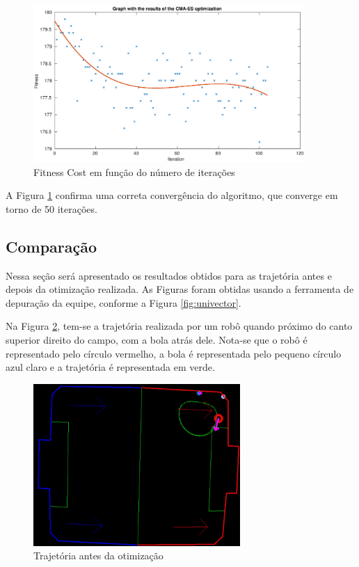 \documentclass[10pt,fleqn,a4paper]{article}
\begin{document}
\begin{figure}[H]
	\centering
	\includegraphics[width=0.92\textwidth]{figures/CMA-ES_Fitness_Results_ally.eps}
	\caption{Fitness Cost em função do número de iterações}
	\label{fig:fitness_trajetoria_basica_ally}
\end{figure}

A Figura \ref{fig:fitness_trajetoria_basica_ally} confirma uma correta convergência do algoritmo, que converge em torno de 50 iterações.

\subsection{Comparação}

Nessa seção será apresentado os resultados obtidos para as trajetória antes e depois da otimização realizada. As Figuras foram obtidas usando a ferramenta de depuração da equipe, conforme a Figura \ref{fig:univector}.

Na Figura \ref{fig:ruim_trajetoria}, tem-se a trajetória realizada por um robô quando próximo do canto superior direito do campo, com a bola atrás dele. Nota-se que o robô é representado pelo círculo vermelho, a bola é representada pelo pequeno círculo azul claro e a trajetória é representada em verde.

\begin{figure}[H]
	\centering
	\includegraphics[width=0.7\textwidth]{figures/ruim_trajetoria.png}
	\caption{Trajetória antes da otimização}
	\label{fig:ruim_trajetoria}
\end{figure}
\end{document}

